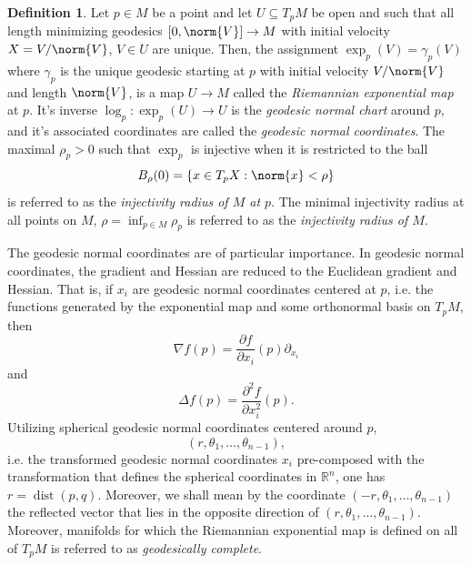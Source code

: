 \documentclass[12pt,a4paper]{article}
\theoremstyle{definition}
\newtheorem{definition}[theorem]{Definition}
\theoremstyle{remark}
\DeclareMathOperator{\dist}{dist}
\begin{document}
\begin{definition}
\label{def:geodexplog}
Let $p\in M$ be a point and let $U\subseteq T_pM$ be open and such that all length minimizing geodesics $[0,\norm{V}]\rightarrow M$ with initial velocity $X= V/\norm{V}$, $V\in U$ are unique. Then, the assignment $\exp_p(V) = \gamma_p(V)$ where $\gamma_p$ is the unique geodesic starting at $p$ with initial velocity $V/\norm{V}$ and length $\norm{V}$, is a map $U\rightarrow M$ called the \textit{Riemannian exponential map} at $p$. It's inverse $\log_p: \exp_p(U)\rightarrow U$ is the \textit{geodesic normal chart} around $p$, and it's associated coordinates are called the \textit{geodesic normal coordinates}. The maximal $\rho_p >0$ such that $\exp_p$ is injective when it is restricted to the ball
\[
B_\rho(0) = \{x\in T_p X: \norm{x}<\rho\}
\]
is referred to as the \textit{injectivity radius of $M$ at $p$}. The minimal injectivity radius at all points on $M$, $\rho =\inf_{p\in M} \rho_p$ is referred to as the \textit{injectivity radius of $M$}.
\end{definition}


The geodesic normal coordinates are of particular importance. In geodesic normal coordinates, the gradient and Hessian are reduced to the Euclidean gradient and Hessian. That is, if $x_i$ are geodesic normal coordinates centered at $p$, i.e. the functions generated by the exponential map and some orthonormal basis on $T_pM$, then 
\[
\nabla f(p) = \frac{\partial f}{\partial x_i}(p) \partial_{x_i}
\]
and
\[
\Delta f(p) = \frac{\partial^2f}{\partial x_i^2} (p).
\]
Utilizing spherical geodesic normal coordinates centered around $p$, 
\[(r,\theta_1,\dots , \theta_{n-1}),\]
i.e. the transformed geodesic normal coordinates $x_i$ pre-composed with the transformation that defines the spherical coordinates in $\mathbb{R}^n$, one has $r=\dist(p,q)$. Moreover, we shall mean by the coordinate $(-r,\theta_1,\dots, \theta_{n-1})$ the reflected vector that lies in the opposite direction of $(r,\theta_1,\dots,\theta_{n-1})$. Moreover, manifolds for which the Riemannian exponential map is defined on all of $T_p M$ is referred to as \textit{geodesically complete}.
\end{document}
